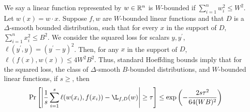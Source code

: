 We say a linear function represented by $w \in \mathbb{R}^n$ is $W$-bounded if
$\sum_{i=1}^n w_i^2 \leq W^2$. Let $w(x) = w \cdot x$. Suppose $f, w$ are
$W$-bounded linear functions and that $D$ is a $\Delta$-smooth bounded
distribution, such that for every $x$ in the support of $D$, $\sum_{i=1}^n x_i^2
\leq B^2$. We consider the squared loss for scalars $y, y^\prime$,
$\ell(y^\prime, y) = (y^\prime - y)^2$.
Then, for any $x$ in the support of $D$, $\ell(f(x), w(x)) \leq 4 W^2B^2$. Thus,
standard Hoeffding bounds imply that for the squared loss, the class of
$\Delta$-smooth $B$-bounded distributions, and $W$-bounded linear functions, if
 $s \geq $, then
\[ 
\Pr\left[\left| \frac{1}{s} \sum_{i=1}^s \ell(w(x_i), f(x_i)) - \L_{f, D}(w) \right|
\geq \tau \right] \leq \exp\left( -\frac{2 s \tau^2}{64(WB)^2}\right)
\]


% 

